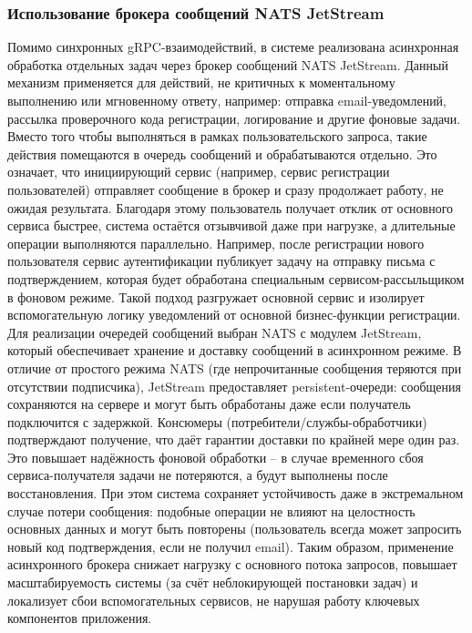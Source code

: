 \subsubsection*{Использование брокера сообщений NATS JetStream}
Помимо синхронных gRPC-взаимодействий, в системе реализована асинхронная обработка отдельных задач через брокер сообщений NATS JetStream. Данный механизм применяется для действий, не критичных к моментальному выполнению или мгновенному ответу, например: отправка email-уведомлений, рассылка проверочного кода регистрации, логирование и другие фоновые задачи. Вместо того чтобы выполняться в рамках пользовательского запроса, такие действия помещаются в очередь сообщений и обрабатываются отдельно. Это означает, что инициирующий сервис (например, сервис регистрации пользователей) отправляет сообщение в брокер и сразу продолжает работу, не ожидая результата. Благодаря этому пользователь получает отклик от основного сервиса быстрее, система остаётся отзывчивой даже при нагрузке, а длительные операции выполняются параллельно. Например, после регистрации нового пользователя сервис аутентификации публикует задачу на отправку письма с подтверждением, которая будет обработана специальным сервисом-рассыльщиком в фоновом режиме. Такой подход разгружает основной сервис и изолирует вспомогательную логику уведомлений от основной бизнес-функции регистрации.
Для реализации очередей сообщений выбран NATS с модулем JetStream, который обеспечивает хранение и доставку сообщений в асинхронном режиме. В отличие от простого режима NATS (где непрочитанные сообщения теряются при отсутствии подписчика), JetStream предоставляет persistent-очереди: сообщения сохраняются на сервере и могут быть обработаны даже если получатель подключится с задержкой. Консюмеры (потребители/службы-обработчики) подтверждают получение, что даёт гарантии доставки по крайней мере один раз. Это повышает надёжность фоновой обработки – в случае временного сбоя сервиса-получателя задачи не потеряются, а будут выполнены после восстановления. При этом система сохраняет устойчивость даже в экстремальном случае потери сообщения: подобные операции не влияют на целостность основных данных и могут быть повторены (пользователь всегда может запросить новый код подтверждения, если не получил email). Таким образом, применение асинхронного брокера снижает нагрузку с основного потока запросов, повышает масштабируемость системы (за счёт неблокирующей постановки задач) и локализует сбои вспомогательных сервисов, не нарушая работу ключевых компонентов приложения.

